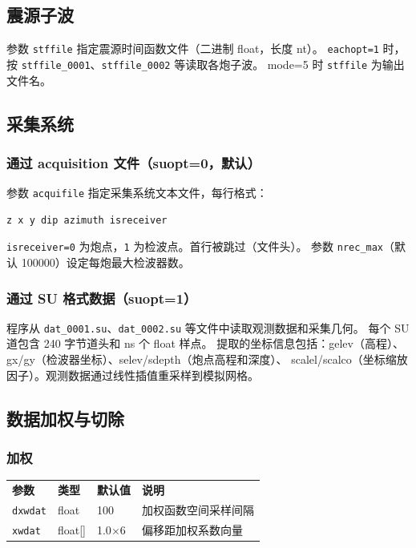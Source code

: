 \documentclass[11pt,a4paper]{ctexart}
\begin{document}
\subsection{震源子波}

参数 \texttt{stffile} 指定震源时间函数文件（二进制 float，长度 nt）。
\texttt{eachopt=1} 时，按 \texttt{stffile\_0001}、\texttt{stffile\_0002} 等读取各炮子波。
mode=5 时 \texttt{stffile} 为输出文件名。

\subsection{采集系统}

\subsubsection{通过 acquisition 文件（suopt=0，默认）}

参数 \texttt{acquifile} 指定采集系统文本文件，每行格式：

\begin{lstlisting}
z x y dip azimuth isreceiver
\end{lstlisting}

\texttt{isreceiver=0} 为炮点，\texttt{1} 为检波点。首行被跳过（文件头）。
参数 \texttt{nrec\_max}（默认 100000）设定每炮最大检波器数。

\subsubsection{通过 SU 格式数据（suopt=1）}

程序从 \texttt{dat\_0001.su}、\texttt{dat\_0002.su} 等文件中读取观测数据和采集几何。
每个 SU 道包含 240 字节道头和 ns 个 float 样点。
提取的坐标信息包括：gelev（高程）、gx/gy（检波器坐标）、selev/sdepth（炮点高程和深度）、
scalel/scalco（坐标缩放因子）。观测数据通过线性插值重采样到模拟网格。

\subsection{数据加权与切除}

\subsubsection{加权}

\begin{tabular}{lllp{5cm}}
\textbf{参数} & \textbf{类型} & \textbf{默认值} & \textbf{说明} \\
\texttt{dxwdat} & float & 100 & 加权函数空间采样间隔 \\
\texttt{xwdat}  & float[] & 1.0$\times$6 & 偏移距加权系数向量 \\
\end{tabular}
\end{document}
